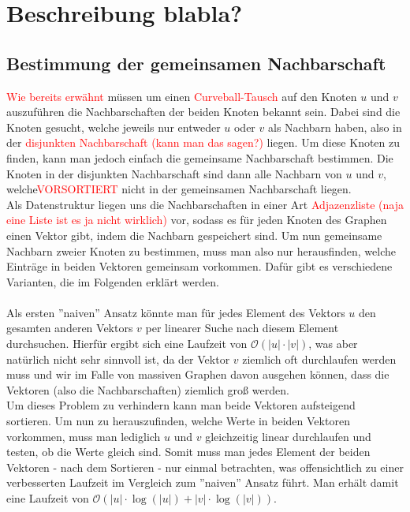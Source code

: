\documentclass[a4paper]{scrreprt}
\def\O{\mathcal{O}}
\theoremstyle{plain} %
\theoremstyle{definition} %
\begin{document}
\chapter{Beschreibung blabla?}


\section{Bestimmung der gemeinsamen Nachbarschaft}
\textcolor{red}{Wie bereits erwähnt} müssen um einen \textcolor{red}{Curveball-Tausch} auf den Knoten $u$ und $v$
auszuführen die Nachbarschaften der beiden Knoten bekannt sein. Dabei sind die Knoten gesucht, 
welche jeweils nur entweder $u$ oder $v$ als Nachbarn haben, also in der \textcolor{red}{disjunkten Nachbarschaft (kann man das sagen?)} liegen.
Um diese Knoten zu finden, kann man jedoch einfach die gemeinsame Nachbarschaft bestimmen. Die Knoten
in der disjunkten Nachbarschaft sind dann alle Nachbarn von $u$ und $v$, welche\textcolor{red}{VORSORTIERT}
 nicht in der gemeinsamen
Nachbarschaft liegen. 
\\
Als Datenstruktur liegen uns die Nachbarschaften in einer Art \textcolor{red}{Adjazenzliste (naja eine Liste ist es ja nicht wirklich)}
vor, sodass es für jeden Knoten des Graphen einen Vektor gibt, indem die Nachbarn gespeichert sind.
Um nun gemeinsame Nachbarn
zweier Knoten zu bestimmen, muss man also nur herausfinden, welche Einträge in beiden Vektoren gemeinsam
vorkommen. Dafür gibt es verschiedene Varianten, die 
im Folgenden erklärt werden.
\\
\\
Als ersten ''naiven'' Ansatz könnte man für jedes Element des Vektors $u$ den gesamten anderen 
Vektors $v$ per linearer Suche nach diesem Element durchsuchen. Hierfür ergibt sich eine Laufzeit von
$\O(|u|\cdot|v|)$, was aber natürlich nicht sehr sinnvoll ist, da der Vektor $v$ ziemlich oft 
durchlaufen werden muss und wir 
im Falle von massiven Graphen davon ausgehen können, dass die Vektoren (also die Nachbarschaften)
ziemlich groß werden. 
\\
Um dieses Problem zu verhindern kann man beide Vektoren aufsteigend sortieren. Um nun zu herauszufinden,
welche Werte in beiden Vektoren vorkommen, muss man lediglich $u$ und $v$ gleichzeitig linear durchlaufen
und testen, ob die Werte gleich sind. Somit muss man jedes Element der beiden Vektoren - nach dem Sortieren - 
nur einmal betrachten, was offensichtlich zu einer verbesserten Laufzeit im Vergleich zum ''naiven''
Ansatz führt. Man erhält damit eine Laufzeit von $\O(|u|\cdot \log (|u|)  + |v|\cdot\log(|v|))$. 
\end{document}
